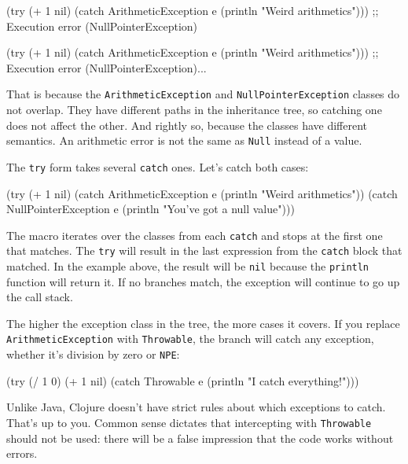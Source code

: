 \ifnarrow

\begin{clojure}
(try
  (+ 1 nil)
  (catch ArithmeticException e
    (println "Weird arithmetics")))
;; Execution error (NullPointerException)
\end{clojure}

\else

\begin{clojure}
(try
  (+ 1 nil)
  (catch ArithmeticException e
    (println "Weird arithmetics")))
;; Execution error (NullPointerException)...
\end{clojure}

\fi


That is because the \verb|ArithmeticException| and \verb|NullPointerException| classes do not overlap. They have different paths in the inheritance tree, so catching one does not affect the other. And rightly so, because the classes have different semantics. An arithmetic error is not the same as \verb|Null| instead of a value.


The \verb|try| form takes several \verb|catch| ones. Let's catch both cases:

\begin{clojure}
(try
  (+ 1 nil)
  (catch ArithmeticException e
    (println "Weird arithmetics"))
  (catch NullPointerException e
    (println "You've got a null value")))
\end{clojure}

The macro iterates over the classes from each \verb|catch| and stops at the first one that matches. The \verb|try| will result in the last expression from the \verb|catch| block that matched. In the example above, the result will be \verb|nil| because the \verb|println| function will return it. If no branches match, the exception will continue to go up the call stack.


The higher the exception class in the tree, the more cases it covers. If you replace \verb|ArithmeticException| with \verb|Throwable|, the branch will catch any exception, whether it's division by zero or \verb|NPE|:

\begin{clojure}
(try
  (/ 1 0)
  (+ 1 nil)
  (catch Throwable e
    (println "I catch everything!")))
\end{clojure}

Unlike Java, Clojure doesn't have strict rules about which exceptions to catch. That's up to you. Common sense dictates that intercepting with \verb|Throwable| should not be used: there will be a false impression that the code works without errors.

